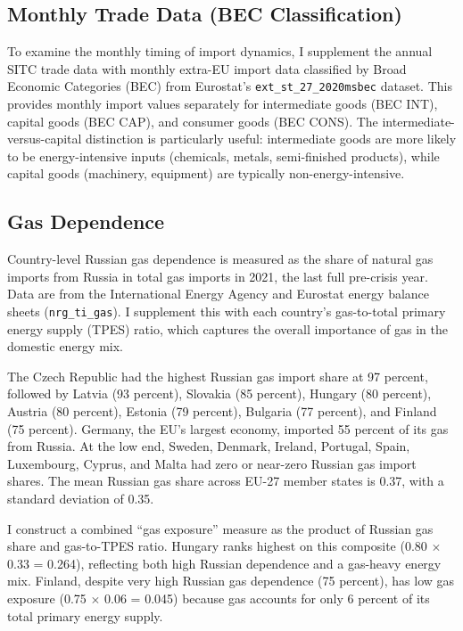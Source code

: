 \documentclass[12pt]{article}
\begin{document}
\subsection{Monthly Trade Data (BEC Classification)}

To examine the monthly timing of import dynamics, I supplement the annual SITC trade data with monthly extra-EU import data classified by Broad Economic Categories (BEC) from Eurostat's \texttt{ext\_st\_27\_2020msbec} dataset. This provides monthly import values separately for intermediate goods (BEC INT), capital goods (BEC CAP), and consumer goods (BEC CONS). The intermediate-versus-capital distinction is particularly useful: intermediate goods are more likely to be energy-intensive inputs (chemicals, metals, semi-finished products), while capital goods (machinery, equipment) are typically non-energy-intensive.

\subsection{Gas Dependence}

Country-level Russian gas dependence is measured as the share of natural gas imports from Russia in total gas imports in 2021, the last full pre-crisis year. Data are from the International Energy Agency and Eurostat energy balance sheets (\texttt{nrg\_ti\_gas}). I supplement this with each country's gas-to-total primary energy supply (TPES) ratio, which captures the overall importance of gas in the domestic energy mix.

The Czech Republic had the highest Russian gas import share at 97 percent, followed by Latvia (93 percent), Slovakia (85 percent), Hungary (80 percent), Austria (80 percent), Estonia (79 percent), Bulgaria (77 percent), and Finland (75 percent). Germany, the EU's largest economy, imported 55 percent of its gas from Russia. At the low end, Sweden, Denmark, Ireland, Portugal, Spain, Luxembourg, Cyprus, and Malta had zero or near-zero Russian gas import shares. The mean Russian gas share across EU-27 member states is 0.37, with a standard deviation of 0.35.

I construct a combined ``gas exposure'' measure as the product of Russian gas share and gas-to-TPES ratio. Hungary ranks highest on this composite (0.80 $\times$ 0.33 = 0.264), reflecting both high Russian dependence and a gas-heavy energy mix. Finland, despite very high Russian gas dependence (75 percent), has low gas exposure (0.75 $\times$ 0.06 = 0.045) because gas accounts for only 6 percent of its total primary energy supply.
\end{document}
